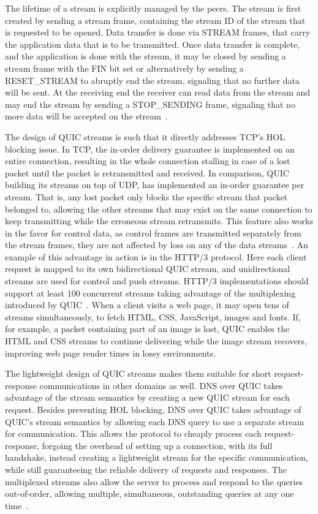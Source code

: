 \documentclass[english, 12pt, a4paper, elec, utf8, a-2b, online]{aaltothesis}
\begin{document}
The lifetime of a stream is explicitly managed by the peers. The stream is first
created by sending a stream frame, containing the stream ID of the stream that is
requested to be opened. Data transfer is done via STREAM frames, that carry the
application data that is to be transmitted. Once data transfer is complete, and
the application is done with the stream, it may be closed by sending a stream
frame with the FIN bit set or alternatively by sending a RESET\_STREAM to abruptly end the
stream, signaling that no further data will be sent. At the receiving end the receiver
can read data from the stream and may end the stream by sending a STOP\_SENDING frame,
signaling that no more data will be accepted on the stream~\cite{rfc9000}.

The design of QUIC streams is such that it directly addresses TCP's HOL blocking
issue. In TCP, the in-order delivery guarantee is implemented on an entire connection,
resulting in the whole connection stalling in case of a lost packet until the packet is
retransmitted and received. In comparison, QUIC building its streams on top of
UDP, has implemented an in-order guarantee per stream. That is, any lost packet
only blocks the specific stream that packet belonged to, allowing the other streams
that may exist on the same connection to keep transmitting while the erroneous
stream retransmits. This feature also works in the favor for control data,
as control frames are transmitted separately from the stream frames, they are not
affected by loss on any of the data streams~\cite{rfc9000}. An example of this advantage
in action is in the HTTP/3 protocol. Here each client request is mapped to its own
bidirectional QUIC stream, and unidirectional streams are used for control and
push streams. HTTP/3 implementations should support at least 100 concurrent streams
taking advantage of the multiplexing introduced by QUIC~\cite{rfc9114}. When a client
visits a web page, it may open tens of streams simultaneously, to fetch HTML, CSS,
JavaScript, images and fonts. If, for example, a packet containing part of an image is lost, QUIC
enables the HTML and CSS streams to continue delivering while the image stream recovers,
improving web page render times in lossy environments.

The lightweight  design of QUIC streams makes them suitable for short request-response
communications in other domains as well. DNS over QUIC takes advantage of the
stream semantics by creating a new QUIC stream for each request. Besides preventing
HOL blocking, DNS over QUIC takes advantage of QUIC's stream semantics by allowing
each DNS query to use a separate stream for communication. This allows the protocol
to cheaply process each request-response, forgoing the overhead of setting up a connection,
with its full handshake, instead creating a lightweight stream for the specific
communication, while still guaranteeing the reliable delivery of requests and responses.
The multiplexed streams also allow the server to process and respond to the queries
out-of-order, allowing multiple, simultaneous, outstanding queries at any one time~\cite{rfc9250}.
\end{document}
